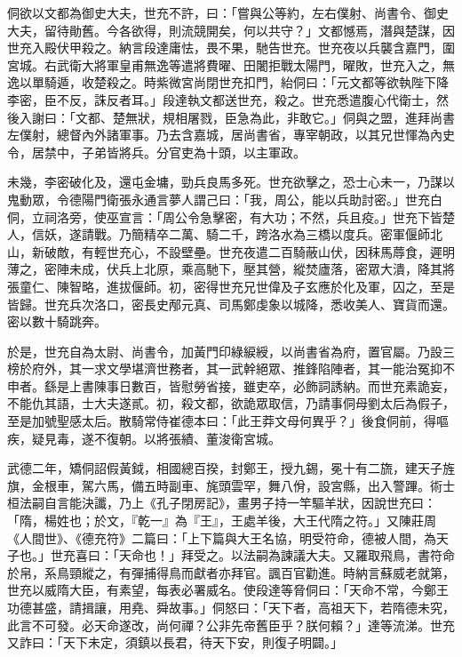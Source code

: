 \begin{pinyinscope}
 侗欲以文都為御史大夫，世充不許，曰：「嘗與公等約，左右僕射、尚書令、御史大夫，留待勛舊。今各欲得，則流競開矣，何以共守？」文都憾焉，潛與楚謀，因世充入殿伏甲殺之。納言段達庸怯，畏不果，馳告世充。世充夜以兵襲含嘉門，圍宮城。右武衛大將軍皇甫無逸等遣將費曜、田闍拒戰太陽門，曜敗，世充入之，無逸以單騎遁，收楚殺之。時紫微宮尚閉世充扣門，紿侗曰：「元文都等欲執陛下降李密，臣不反，誅反者耳。」段達執文都送世充，殺之。世充悉遣腹心代衛士，然後入謝曰：「文都、楚無狀，規相屠戮，臣急為此，非敢它。」侗與之盟，進拜尚書左僕射，總督內外諸軍事。乃去含嘉城，居尚書省，專宰朝政，以其兄世惲為內史令，居禁中，子弟皆將兵。分官吏為十頭，以主軍政。



 未幾，李密破化及，還屯金墉，勁兵良馬多死。世充欲擊之，恐士心未一，乃謀以鬼動眾，令德陽門衛張永通言夢人謂己曰：「我，周公，能以兵助討密。」世充白侗，立祠洛旁，使巫宣言：「周公令急擊密，有大功；不然，兵且疫。」世充下皆楚人，信妖，遂請戰。乃簡精卒二萬、騎二千，跨洛水為三橋以度兵。密軍偃師北山，新破敵，有輕世充心，不設壁壘。世充夜遣二百騎蔽山伏，因秣馬蓐食，遲明薄之，密陣未成，伏兵上北原，乘高馳下，壓其營，縱焚廬落，密眾大潰，降其將張童仁、陳智略，進拔偃師。初，密得世充兄世偉及子玄應於化及軍，囚之，至是皆歸。世充兵次洛口，密長史邴元真、司馬鄭虔象以城降，悉收美人、寶貨而還。密以數十騎跳奔。



 於是，世充自為太尉、尚書令，加黃門印綠綟綬，以尚書省為府，置官屬。乃設三榜於府外，其一求文學堪濟世務者，其一武幹絕眾、推鋒陷陣者，其一能治冤抑不申者。繇是上書陳事日數百，皆慰勞省接，雖吏卒，必飾詞誘納。而世充素詭妄，不能仇其語，士大夫遂貳。初，殺文都，欲詭眾取信，乃請事侗母劉太后為假子，至是加號聖感太后。散騎常侍崔德本曰：「此王莽文母何異乎？」後食侗前，得嘔疾，疑見毒，遂不復朝。以將張績、董浚衛宮城。



 武德二年，矯侗詔假黃鉞，相國總百揆，封鄭王，授九錫，冕十有二旒，建天子旌旗，金根車，駕六馬，備五時副車、旄頭雲罕，舞八佾，設宮縣，出入警蹕。術士桓法嗣自言能決讖，乃上《孔子閉房記》，畫男子持一竿驅羊狀，因說世充曰：「隋，楊姓也；於文，『乾一』為『王』，王處羊後，大王代隋之符。」又陳莊周《人間世》、《德充符》二篇曰：「上下篇與大王名協，明受符命，德被人間，為天子也。」世充喜曰：「天命也！」拜受之。以法嗣為諫議大夫。又羅取飛鳥，書符命於帛，系鳥頸縱之，有彈捕得鳥而獻者亦拜官。諷百官勸進。時納言蘇威老就第，世充以威隋大臣，有素望，每表必署威名。使段達等脅侗曰：「天命不常，今鄭王功德甚盛，請揖讓，用堯、舜故事。」侗怒曰：「天下者，高祖天下，若隋德未究，此言不可發。必天命遂改，尚何禪？公非先帝舊臣乎？朕何賴？」達等流涕。世充又詐曰：「天下未定，須鎮以長君，待天下安，則復子明闢。」




\end{pinyinscope}
